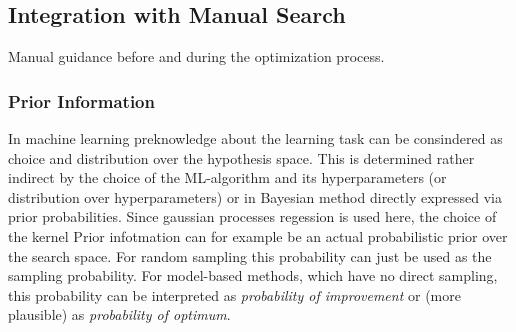 \documentclass[english]{article}
\begin{document}
\subsection{Integration with Manual Search}
Manual guidance before and during the optimization process.

\subsubsection*{Prior Information}
In machine learning preknowledge about the learning task can be consindered as choice and distribution over the hypothesis space. This is determined rather indirect by the choice of the \ac{ML}-algorithm and its hyperparameters (or distribution over hyperparameters) or in Bayesian method directly expressed via prior probabilities. Since gaussian processes regession is used here, the choice of the kernel
Prior infotmation can for example be an actual probabilistic prior over the search space. For random sampling this probability can just be used as the sampling probability. For model-based methods, which have no direct sampling, this probability can be interpreted as \textit{probability of improvement} or (more plausible) as \textit{probability of optimum}.
\end{document}
